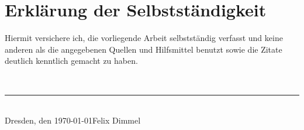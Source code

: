 
\chapter*{Erklärung der Selbstständigkeit}
\thispagestyle{empty}
Hiermit versichere ich, die vorliegende Arbeit selbstständig verfasst und keine
anderen als die angegebenen Quellen und Hilfsmittel benutzt sowie die Zitate
deutlich kenntlich gemacht zu haben.

\mbox{}\vspace{2\baselineskip}\\

\hfill\noindent\rule{5cm}{0.2pt}\\
Dresden, den \today \hfill Felix Dimmel

\clearpage\mbox{}\thispagestyle{empty}

